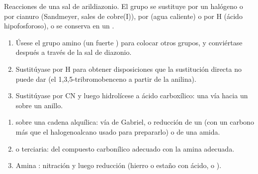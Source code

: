 \begin{omfigure}

{\small Reacciones de una sal de arildiazonio. El grupo  se sustituye por un halógeno o por
cianuro (Sandmeyer, sales de cobre(I)), por  (agua caliente) o por H (ácido hipofosforoso), o
se conserva en un .}
\end{omfigure}

\begin{method}\label{met:b2:amines:diazonium-routes}
\begin{enumerate}
  \item Úsese el grupo amino (un fuerte ) para colocar otros grupos, y conviértase después
        a través de la sal de diazonio.
  \item Sustitúyase por H para obtener disposiciones que la sustitución directa no puede dar
        (el 1,3,5-tribromobenceno a partir de la anilina).
  \item Sustitúyase por CN y luego hidrolícese a ácido carboxílico: una vía hacia un  sobre un anillo.
\end{enumerate}
\end{method}

\begin{method}\label{met:b2:amines:make-amine}
\begin{enumerate}
  \item {} sobre una cadena alquílica: vía de Gabriel, o reducción de un  (con un carbono
        más que el halogenoalcano usado para prepararlo) o de una amida.
  \item {} o terciaria:  del compuesto carbonílico adecuado con
        la amina adecuada.
  \item Amina : nitración y luego reducción (hierro o estaño con ácido, o ).
\end{enumerate}
\end{method}

